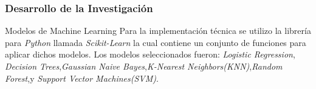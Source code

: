 \documentclass[xcolor=dvipsnames,xcolor=table]{beamer} %
\begin{document}
\begin{frame}
	\frametitle{Desarrollo de la Investigación}
	\begin{block}{Modelos de Machine Learning}\justifying
		Para la implementación técnica se utilizo la librería para \textit{Python} llamada \textit{Scikit-Learn} la cual contiene un conjunto de funciones para aplicar dichos modelos. Los modelos  seleccionados fueron: \textit{Logistic Regression}, \textit{Decision Trees},\textit{Gaussian Naive Bayes},\textit{K-Nearest Neighbors(KNN)},\textit{Random Forest},y \textit{Support Vector Machines(SVM)}\cite{b4}.
	\end{block}
\end{frame}

\end{document}
